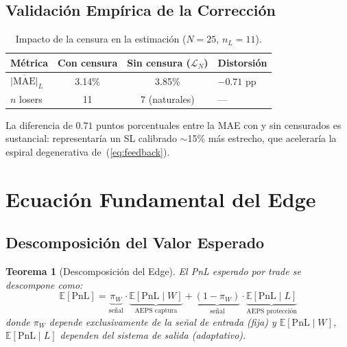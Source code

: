\documentclass[11pt,a4paper]{article}
\newtheorem{theorem}{Teorema}[section]
\newcommand{\E}{\mathbb{E}}
\begin{document}
\subsection{Validaci\'on Emp\'irica de la Correcci\'on}

\begin{table}[H]
\centering
\caption{Impacto de la censura en la estimaci\'on ($N=25$, $n_L=11$).}
\label{tab:censoring_impact}
\begin{tabular}{lccl}
\toprule
\textbf{M\'etrica} & \textbf{Con censura} & \textbf{Sin censura ($\mathcal{L}_N$)} & \textbf{Distorsi\'on} \\
\midrule
$\overline{|\text{MAE}|}_L$ & 3.14\% & 3.85\% & $-0.71$ pp \\
$n$ losers & 11 & 7 (naturales) & --- \\
\bottomrule
\end{tabular}
\end{table}

La diferencia de $0.71$ puntos porcentuales entre la MAE con y sin
censurados es sustancial: representar\'ia un SL calibrado $\sim$15\%
m\'as estrecho, que acelerar\'ia la espiral degenerativa de~(\ref{eq:feedback}).


\section{Ecuaci\'on Fundamental del Edge}
\label{sec:edge}

\subsection{Descomposici\'on del Valor Esperado}

\begin{theorem}[Descomposici\'on del Edge]
\label{thm:edge}
El PnL esperado por trade se descompone como:
\begin{equation}
\E[\text{PnL}] = \underbrace{\pi_W}_{\text{se\~nal}}
  \cdot \underbrace{\E[\text{PnL} \mid W]}_{\text{AEPS captura}}
  + \underbrace{(1-\pi_W)}_{\text{se\~nal}}
  \cdot \underbrace{\E[\text{PnL} \mid L]}_{\text{AEPS protecci\'on}}
\label{eq:edge}
\end{equation}
donde $\pi_W$ depende exclusivamente de la se\~nal de entrada (fija)
y $\E[\text{PnL} \mid W]$, $\E[\text{PnL} \mid L]$ dependen del
sistema de salida (adaptativo).
\end{theorem}
\end{document}
